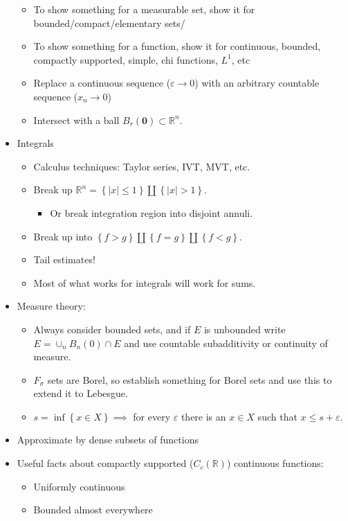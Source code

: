 \begin{itemize}
  \begin{itemize}
  \tightlist
  \item
    To show something for a measurable set, show it for
    bounded/compact/elementary sets/
  \item
    To show something for a function, show it for continuous, bounded,
    compactly supported, simple, chi functions, \(L^1\), etc
  \item
    Replace a continuous sequence (\({\varepsilon}\to 0\)) with an
    arbitrary countable sequence (\(x_n \to 0\))
  \item
    Intersect with a ball \(B_r(\mathbf{0})\subset {\mathbb{R}}^n\).
  \end{itemize}
\item
  Integrals

  \begin{itemize}
  \tightlist
  \item
    Calculus techniques: Taylor series, IVT, MVT, etc.
  \item
    Break up
    \({\mathbb{R}}^n = \left\{{{\left\lvert {x} \right\rvert} \leq 1}\right\} \coprod \left\{{{\left\lvert {x} \right\rvert} > 1}\right\}\).

    \begin{itemize}
    \tightlist
    \item
      Or break integration region into disjoint annuli.
    \end{itemize}
  \item
    Break up into
    \(\left\{{f>g}\right\} {\textstyle\coprod}\left\{{f=g}\right\} {\textstyle\coprod}\left\{{f< g}\right\}\).
  \item
    Tail estimates!
  \item
    Most of what works for integrals will work for sums.
  \end{itemize}
\item
  Measure theory:

  \begin{itemize}
  \item
    Always consider bounded sets, and if \(E\) is unbounded write
    \(E = \cup_{n} B_{n}(0) \cap E\) and use countable subadditivity or
    continuity of measure.
  \item
    \(F_\sigma\) sets are Borel, so establish something for Borel sets
    and use this to extend it to Lebesgue.
  \item
    \(s = \inf\left\{{x\in X}\right\} \implies\) for every
    \(\varepsilon\) there is an \(x\in X\) such that
    \(x \leq s + \varepsilon\).
  \end{itemize}
\item
  Approximate by dense subsets of functions
\item
  Useful facts about compactly supported (\(C_c({\mathbb{R}})\))
  continuous functions:

  \begin{itemize}
  \tightlist
  \item
    Uniformly continuous
  \item
    Bounded almost everywhere
  \end{itemize}
\end{itemize}

